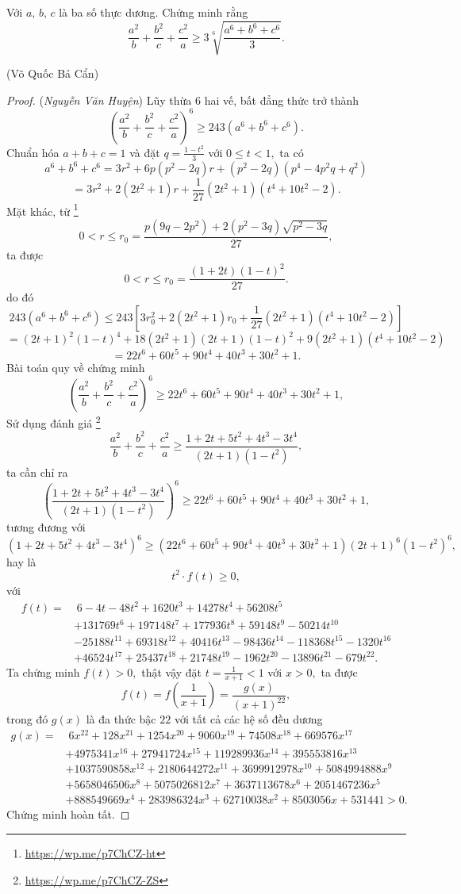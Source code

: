 \documentclass[12pt,a4paper]{book}
\begin{document}
\begin{bt}
Với $a,\,b,\,c$ là ba số thực dương. Chứng minh rằng
\[\frac{a^2}{b}+\frac{b^2}{c}+\frac{c^2}{a} \ge 3\sqrt[6]{\frac{a^6+b^6+c^6}{3}}.\]
\vspace{-1.3cm}
\begin{flushright}(Võ Quốc Bá Cẩn)\end{flushright}
\end{bt}

\begin{proof}
(\textit{Nguyễn Văn Huyện}) Lũy thừa $6$ hai vế, bất đẳng thức trở thành
\[\left(\frac{a^2}{b}+\frac{b^2}{c}+\frac{c^2}{a}\right)^6 \ge 243(a^6+b^6+c^6).\]
Chuẩn hóa $a+b+c=1$ và đặt $q=\frac{1-t^2}{3} $ với $0 \le t < 1, $ ta có 
\[a^6+b^6+c^6=3r^2+6p(p^2-2q)r+(p^2-2q)(p^4-4p^2q+q^2)\]
\[=3r^2+2(2t^2+1)r+\frac{1}{27}(2t^2+1)(t^4+10t^2-2).\]
Mặt khác, từ \footnote{\url{https://wp.me/p7ChCZ-ht}}
\[0 < r \leqslant r_0 = \frac{p(9q-2p^2)+2(p^2-3q)\sqrt{p^2-3q}}{27},\]
ta được
\[0 < r \leqslant r_0 = \frac{(1+2t)(1-t)^2}{27}.\]
do đó
\[243(a^6+b^6+c^6) \leqslant 243\left[3r_0^2+2(2t^2+1)r_0+\frac{1}{27}(2t^2+1)(t^4+10t^2-2)\right]\]
\[=(2t+1)^2(1-t)^4+18(2t^2+1)(2t+1)(1-t)^2+9(2t^2+1)(t^4+10t^2-2)\]
\[=22t^6+60t^5+90t^4+40t^3+30t^2+1.\]
Bài toán quy về chứng minh
\[\left(\frac{a^2}{b}+\frac{b^2}{c}+\frac{c^2}{a}\right)^6 \ge 22t^6+60t^5+90t^4+40t^3+30t^2+1,\]
Sử dụng đánh giá \footnote{\url{https://wp.me/p7ChCZ-ZS}}
\[\frac{a^2}{b}+\frac{b^2}{c}+\frac{c^2}{a} \ge \frac{1+2t+5t^2+4t^3-3t^4}{(2t+1)(1-t^2)},\]
ta cần chỉ ra
\[\left(\frac{1+2t+5t^2+4t^3-3t^4}{(2t+1)(1-t^2)}\right)^6 \ge 22t^6+60t^5+90t^4+40t^3+30t^2+1,\]
tương đương với
\[(1+2t+5t^2+4t^3-3t^4)^6 \ge (22t^6+60t^5+90t^4+40t^3+30t^2+1)(2t+1)^6(1-t^2)^6,\]
hay là
\[t^2 \cdot f(t) \geq 0,\]
với
\[\begin{aligned}
f(t) = & \; 6-4t-48t^2+1620t^3+14278t^4+56208t^5
\\&+131769t^6+197148t^7+177936t^8+59148t^9-50214t^{10}
\\&-25188t^{11}+69318t^{12}+40416t^{13}-98436t^{14}-118368t^{15}-1320t^{16}
\\&+46524t^{17}+25437t^{18}+21748t^{19}-1962t^{20}-13896t^{21}-679t^{22}.
\end{aligned}\]
Ta chứng minh $f(t) >0,$ thật vậy đặt $t = \frac{1}{x+1} < 1$ với $x>0,$ ta được
\[f(t) = f\left(\frac{1}{x+1}\right)  = \frac{g(x)}{(x+1)^{22}},\]
trong đó $g(x)$ là đa thức bậc $22$ với tất cả các hệ số đều dương
\[\begin{aligned}
g(x) = & \; 6x^{22}+128x^{21}+1254x^{20}+9060x^{19}+74508x^{18}+669576x^{17}
\\&+4975341x^{16}+27941724x^{15}
+119289936x^{14}+395553816x^{13}\\&+1037590858x^{12}+2180644272x^{11}+3699912978x^{10}
+5084994888x^9\\&+5658046506x^8+5075026812x^7+3637113678x^6
+2051467236x^5\\&+888549669x^4+283986324x^3+62710038x^2+8503056x+531441>0.
\end{aligned}\]
Chứng minh hoàn tất.
\end{proof}
\end{document}
